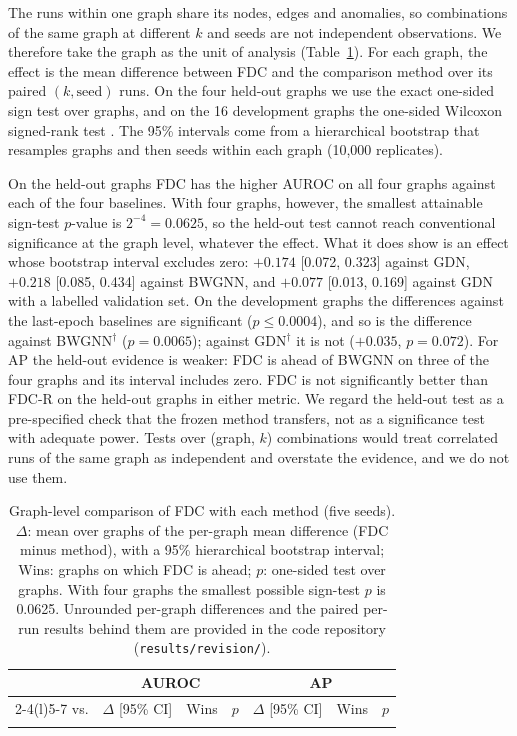 \documentclass[pdflatex,sn-mathphys-ay]{sn-jnl}
\theoremstyle{plain}
\theoremstyle{remark}
\begin{document}
The runs within one graph share its nodes, edges and anomalies, so combinations of the same graph at different $k$ and seeds are not independent observations. We therefore take the graph as the unit of analysis (Table~\ref{tab:graphlevel}). For each graph, the effect is the mean difference between FDC and the comparison method over its paired $(k,\text{seed})$ runs. On the four held-out graphs we use the exact one-sided sign test over graphs, and on the 16 development graphs the one-sided Wilcoxon signed-rank test \citep{wilcoxon1945individual,demsar2006statistical}. The 95\% intervals come from a hierarchical bootstrap that resamples graphs and then seeds within each graph (10{,}000 replicates).

On the held-out graphs FDC has the higher AUROC on all four graphs against each of the four baselines. With four graphs, however, the smallest attainable sign-test $p$-value is $2^{-4}=0.0625$, so the held-out test cannot reach conventional significance at the graph level, whatever the effect. What it does show is an effect whose bootstrap interval excludes zero: $+0.174$ [0.072, 0.323] against GDN, $+0.218$ [0.085, 0.434] against BWGNN, and $+0.077$ [0.013, 0.169] against GDN with a labelled validation set. On the development graphs the differences against the last-epoch baselines are significant ($p\le0.0004$), and so is the difference against BWGNN$^{\dagger}$ ($p=0.0065$); against GDN$^{\dagger}$ it is not ($+0.035$, $p=0.072$). For AP the held-out evidence is weaker: FDC is ahead of BWGNN on three of the four graphs and its interval includes zero. FDC is not significantly better than FDC-R on the held-out graphs in either metric. We regard the held-out test as a pre-specified check that the frozen method transfers, not as a significance test with adequate power. Tests over (graph, $k$) combinations would treat correlated runs of the same graph as independent and overstate the evidence, and we do not use them.

\begin{table}[!ht]
\caption{Graph-level comparison of FDC with each method (five seeds). $\Delta$: mean over graphs of the per-graph mean difference (FDC minus method), with a 95\% hierarchical bootstrap interval; Wins: graphs on which FDC is ahead; $p$: one-sided test over graphs. With four graphs the smallest possible sign-test $p$ is 0.0625. Unrounded per-graph differences and the paired per-run results behind them are provided in the code repository (\texttt{results/revision/}).}
\label{tab:graphlevel}
\scriptsize
\setlength{\tabcolsep}{2.5pt}
\begin{tabular*}{\textwidth}{@{\extracolsep{\fill}}lcccccc@{}}
\toprule
 & \multicolumn{3}{c}{AUROC} & \multicolumn{3}{c}{AP} \\
\cmidrule(lr){2-4}\cmidrule(l){5-7}
vs. & $\Delta$ [95\% CI] & Wins & $p$ & $\Delta$ [95\% CI] & Wins & $p$ \\
\midrule

\botrule
\end{tabular*}
\end{table}
\end{document}
